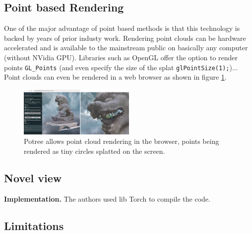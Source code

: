 \subsection{Point based Rendering}
\label{subsec:Point based Rendering}
One of the major advantage of point based methods is that this technology is backed by years of prior industy work. Rendering point clouds can be hardware accelerated and is available to the mainstream public on basically any computer (without NVidia GPU). Libraries such as OpenGL offer the option to render points \texttt{GL\_Points} (and even specify the size of the splat \texttt{glPointSize(1);})... Point clouds can even be rendered in a web browser as shown in figure \ref{fig:potree}.


\begin{figure}[htbp]
    \centering
    \includegraphics[width=0.5\textwidth]{figures/potree_rendering_and_splat.png}
    \caption{Potree \cite{potree} allows point cloud rendering in the browser, points being rendered as tiny circles splatted on the screen.}
    \label{fig:potree}
\end{figure}



\subsection{Novel view}
\label{subsec:Projecting points}



\noindent\textbf{Implementation.} The authors used lib Torch to compile the code. 




\subsection{Limitations}
\label{subsec:Projecting points}
